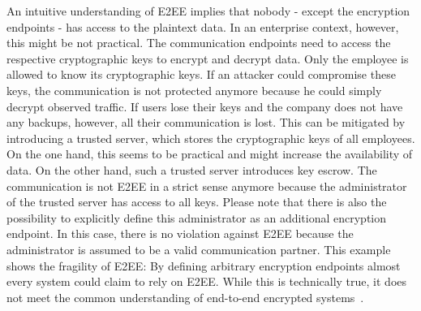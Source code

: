 \documentclass[../main.tex]{subfiles}
\begin{document}
An intuitive understanding of E2EE implies that nobody - except the encryption endpoints - has access to the plaintext data.
In an enterprise context, however, this might be not practical.
The communication endpoints need to access the respective cryptographic keys to encrypt and decrypt data.
Only the employee is allowed to know its cryptographic keys.
If an attacker could compromise these keys, the communication is not protected anymore because he could simply decrypt observed traffic.
If users lose their keys and the company does not have any backups, however, all their communication is lost.
This can be mitigated by introducing a trusted server, which stores the cryptographic keys of all employees.
On the one hand, this seems to be practical and might increase the availability of data. 
On the other hand, such a trusted server introduces key escrow.
The communication is not E2EE in a strict sense anymore because the administrator of the trusted server has access to all keys.
Please note that there is also the possibility to explicitly define this administrator as an additional encryption endpoint.
In this case, there is no violation against E2EE because the administrator is assumed to be a valid communication partner.
This example shows the fragility of E2EE:
By defining arbitrary encryption endpoints almost every system could claim to rely on E2EE.
While this is technically true, it does not meet the common understanding of end-to-end encrypted systems~\cite{Hale2022,Nabeel2017,Mallory2022}.
\end{document}
